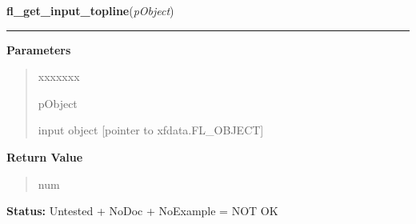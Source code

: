 \hspace{.8\funcindent}\begin{boxedminipage}{\funcwidth}

    \raggedright \textbf{fl\_get\_input\_topline}(\textit{pObject})

    \vspace{-1.5ex}

    \rule{\textwidth}{0.5\fboxrule}
\setlength{\parskip}{2ex}
\setlength{\parskip}{1ex}
      \textbf{Parameters}
      \vspace{-1ex}

      \begin{quote}
        \begin{Ventry}{xxxxxxx}

          \item[pObject]

          input object [pointer to xfdata.FL\_OBJECT]

        \end{Ventry}

      \end{quote}

      \textbf{Return Value}
    \vspace{-1ex}

      \begin{quote}
      num

      \end{quote}

\textbf{Status:} Untested + NoDoc + NoExample = NOT OK



    \end{boxedminipage}

    \label{xformslib:library:fl_get_input_screenlines}

    \vspace{0.5ex}

